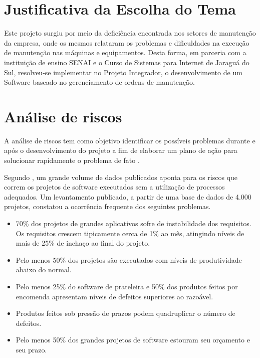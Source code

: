 \section{Justificativa da Escolha do Tema}
Este projeto surgiu por meio da deficiência encontrada nos setores de manutenção da empresa, onde os mesmos relataram os problemas e dificuldades na execução de manutenção nas máquinas e equipamentos. Desta forma, em parceria com a instituição de ensino SENAI e o Curso de Sistemas para Internet de Jaraguá do Sul, resolveu-se implementar no Projeto Integrador, o desenvolvimento de um Software baseado no gerenciamento de ordens de manutenção.

\section{Análise de riscos}
A análise de riscos tem como objetivo identificar os possíveis problemas durante e após o desenvolvimento do projeto a fim de elaborar um plano de ação para solucionar rapidamente o problema de fato \cite{schmitzanalise}.


Segundo \cite{de2003engenharia}, um grande volume de dados publicados aponta para os riscos que correm os projetos de software executados sem a utilização de processos adequados. Um levantamento publicado, a partir de
uma base de dados de 4.000 projetos, constatou a ocorrência frequente dos seguintes
problemas. 

\begin{itemize}
	\item 70\% dos projetos de grandes aplicativos sofre de instabilidade dos requisitos. Os requisitos
	crescem tipicamente cerca de 1\% ao mês, atingindo níveis de mais de 25\% de inchaço ao final
	do projeto.
	\item Pelo menos 50\% dos projetos são executados com níveis de produtividade abaixo do normal.
	\item Pelo menos 25\% do software de prateleira e 50\% dos produtos feitos por encomenda
	apresentam níveis de defeitos superiores ao razoável. 
	\item Produtos feitos sob pressão de prazos podem quadruplicar o número de defeitos.
	\item Pelo menos 50\% dos grandes projetos de software estouram seu orçamento e seu prazo. 
	
\end{itemize}


